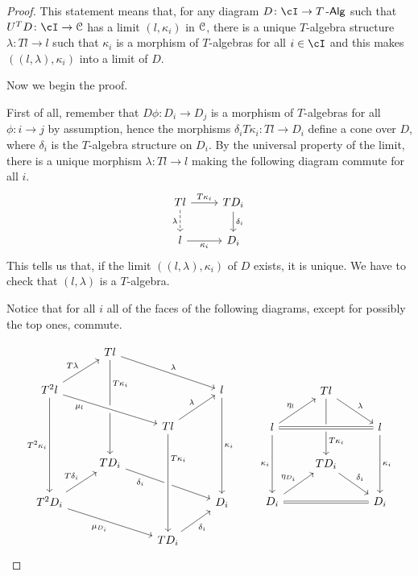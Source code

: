 \documentclass[a4paper,11pt,oneside,openany]{scrbook}
\begin{document}
\begin{proof}
	This statement means that, for any diagram $D\colon\cI\rightarrow T\Alg$ such that $U^TD\colon\cI\rightarrow\C$ has a limit $(l,\kappa_i)$ in $\operatorname{\mathcal{C}}$, there is a unique $T$-algebra structure $\lambda\colon Tl\rightarrow l$ such that $\kappa_i$ is a morphism of $T$-algebras for all $i\in\cI$ and this makes $((l,\lambda),\kappa_i)$ into a limit of $D$.
	
	Now we begin the proof.
	
	First of all, remember that $D\phi\colon D_i\rightarrow D_j$ is a morphism of $T$-algebras for all $\phi\colon i\rightarrow j$ by assumption, hence the morphisms $\delta_i T\kappa_i\colon Tl\rightarrow D_i$ define a cone over $D$, where $\delta_i$ is the $T$-algebra structure on $D_i$. By the universal property of the limit, there is a unique morphism $\lambda\colon Tl\rightarrow l$ making the following diagram commute for all $i$.
	\[
	\begin{tikzcd}
	Tl\ar[d, dashed, "\lambda"'] \ar[r, "T\kappa_i"]
	& TD_i\ar[d, "\delta_i"]\\
	 l\ar[r, "\kappa_i"']
	& D_i
	\end{tikzcd}
	\]	
	This tells us that, if the limit $((l,\lambda),\kappa_i)$ of $D$ exists, it is unique. We have to check that $(l,\lambda)$ is a $T$-algebra.
	
	Notice that for all $i$ all of the faces of the following diagrams, except for possibly the top ones, commute.
	
	\[
		\begin{tikzcd}
			& Tl\ar[drr, "\lambda"]\ar[ddd, "T\kappa_i" near start] \\
			T^2l\ar[ur, "T\lambda"]\ar[drr, crossing over, "\mu_l" near start, swap]\ar[ddd, "T^2\kappa_i"']
			&&& l\ar[ddd, "\kappa_i"] \\
			&& Tl\ar[ur, "\lambda"]%
			\\
			& TD_i\ar[drr, swap, "\delta_i" near start] \\
			T^2D_i\ar[ur, "T\delta_i"]\ar[drr, "\mu_{D_i}"']
			&&& D_i \\
			&& TD_i\ar[ur, "\delta_i"'] \ar[from=uuu,crossing over,  "T\kappa_i" near start]
		\end{tikzcd}
		\quad\quad
		\begin{tikzcd}
			& Tl\ar[dr, "\lambda"]\ar[dd, "T\kappa_i" near end] \\
			l\ar[ur, "\eta_l"]\ar[rr, crossing over, equal]\ar[dd, swap, "\kappa_i"]
			&& l\ar[dd, "\kappa_i"] \\
			& TD_i\ar[dr, "\delta_i"] \\
			D_i\ar[ur, "\eta_{D_i}"]\ar[rr, equal]
			&& D_i
		\end{tikzcd}
	\]
	

\end{proof}
\end{document}
